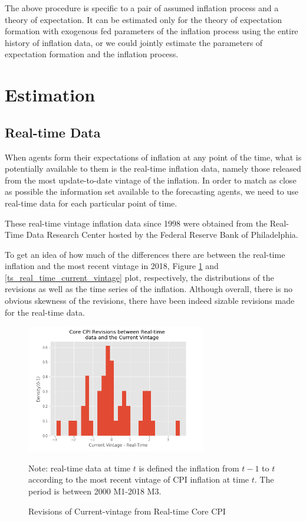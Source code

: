 \documentclass[]{article}
\begin{document}
The above procedure is specific to a pair of assumed inflation process and a theory of expectation. It can be estimated only for the theory of expectation formation with exogenous fed parameters of the inflation process using the entire history of inflation data, or we could jointly estimate the parameters of expectation formation and the inflation process. 

\section{Estimation}
\subsection{Real-time Data}

When agents form their expectations of inflation at any point of the time, what is potentially available to them is the real-time inflation data, namely those released from the most update-to-date vintage of the inflation. In order to match as close as possible the information set available to the forecasting agents, we need to use real-time data for each particular point of time.  

These real-time vintage inflation data since 1998 were obtained from the Real-Time Data Research Center hosted by the Federal Reserve Bank of Philadelphia. 

To get an idea of how much of the differences there are between the real-time inflation and the most recent vintage in 2018, Figure \ref{real_time_rev} and \ref{ts_real_time_current_vintage} plot, respectively, the distributions of the revisions as well as the time series of the inflation. Although overall, there is no obvious skewness of the revisions, there have been indeed sizable revisions made for the real-time data. 

\begin{figure}[htbp]
		\centering
\includegraphics[width=0.7\textwidth]{figures/hist_rev_realtime.png}
\caption{Revisions of Current-vintage from Real-time Core CPI}
\label{real_time_rev}
	\begin{flushleft}
	{\footnotesize Note: real-time data  at time $t$ is defined the inflation from $t-1$ to $t$ according to the most recent vintage of CPI inflation at time $t$. The period is between 2000 M1-2018 M3.}
\end{flushleft}
\end{figure}
\end{document}
